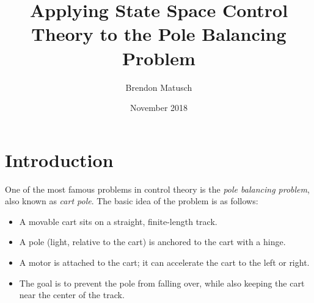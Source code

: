 \documentclass[12pt]{article}
\begin{document}
\title{Applying State Space Control Theory to the Pole Balancing Problem}
\author{Brendon Matusch}
\date{November 2018}
\maketitle

\section{Introduction}

One of the most famous problems in control theory is the \textit{pole balancing problem}, also known as \textit{cart pole}. The basic idea of the problem is as follows:
\begin{itemize}
    \item A movable cart sits on a straight, finite-length track.
    \item A pole (light, relative to the cart) is anchored to the cart with a hinge.
    \item A motor is attached to the cart; it can accelerate the cart to the left or right.
    \item The goal is to prevent the pole from falling over, while also keeping the cart near the center of the track.
\end{itemize}
\end{document}
